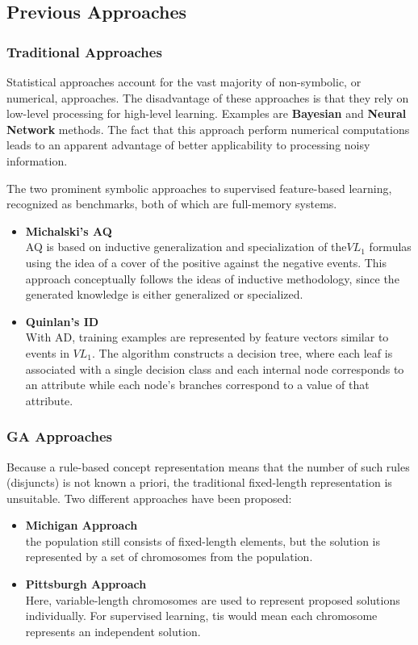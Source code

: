 \documentclass[../main.tex]{subfiles}
\begin{document}
\subsection{Previous Approaches}

\subsubsection{Traditional Approaches}
Statistical approaches account for the vast majority of non-symbolic, or numerical, approaches. The disadvantage of
these approaches is that they rely on low-level processing for high-level learning. Examples are \textbf{Bayesian} and
\textbf{Neural Network} methods. The fact that this approach perform numerical computations leads to an
apparent advantage of better applicability to processing noisy information.

The two prominent symbolic approaches to supervised feature-based learning, recognized
as benchmarks, both of which are full-memory systems.

\begin{itemize}
	\item \textbf{Michalski's AQ} \\
	AQ is based on inductive generalization and specialization of the$VL_1$ formulas using the idea of a cover of the
	positive against the negative events. This approach conceptually follows the ideas of inductive methodology, since
	the generated knowledge is either generalized or specialized.
	\item \textbf{Quinlan's  ID} \\
	With AD, training examples are represented by feature vectors similar to events in $VL_1$.  The algorithm
	constructs a decision tree, where each leaf is associated with a single decision class and each internal node
	corresponds to an attribute while each node's branches correspond to a value of that attribute.
\end{itemize}

\subsubsection{GA Approaches}
Because a rule-based concept representation means that the number of such rules (disjuncts) is not known a priori,  the
traditional fixed-length representation is unsuitable. Two different approaches have been proposed:

\begin{itemize}
	\item \textbf{Michigan Approach} \\
	the population still consists of fixed-length elements, but the solution is represented by a set of chromosomes
	from the population.
	\item \textbf{Pittsburgh Approach} \\
	Here, variable-length chromosomes are used to represent proposed solutions individually. For supervised learning,
	tis would mean each chromosome represents an independent solution.
\end{itemize}
\end{document}
